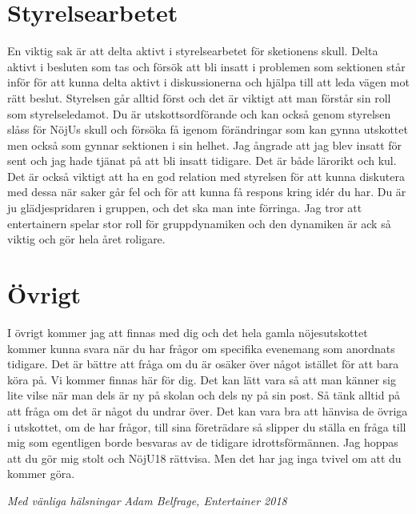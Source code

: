 \documentclass[10pt]{article}
\begin{document}
    \section{Styrelsearbetet}
    En viktig sak är att delta aktivt i styrelsearbetet för sketionens skull. Delta aktivt i besluten som tas och försök att bli insatt i problemen som sektionen står inför för att kunna delta aktivt i diskussionerna och hjälpa till att leda vägen mot rätt beslut. Styrelsen går alltid först och det är viktigt att man förstår sin roll som styrelseledamot. Du är utskottsordförande och kan också genom styrelsen slåss för NöjUs skull och försöka få igenom förändringar som kan gynna utskottet men också som gynnar sektionen i sin helhet. Jag ångrade att jag blev insatt för sent och jag hade tjänat på att bli insatt tidigare. Det är både lärorikt och kul. Det är också viktigt att ha en god relation med styrelsen för att kunna diskutera med dessa när saker går fel och för att kunna få respons kring idér du har. Du är ju glädjespridaren i gruppen, och det ska man inte förringa. Jag tror att entertainern spelar stor roll för gruppdynamiken och den dynamiken är ack så viktig och gör hela året roligare.

    \section{Övrigt}
    I övrigt kommer jag att finnas med dig och det hela gamla nöjesutskottet kommer kunna svara när du har frågor om specifika evenemang som anordnats tidigare. Det är bättre att fråga om du är osäker över något istället för att bara köra på. Vi kommer finnas här för dig. Det kan lätt vara så att man känner sig lite vilse när man dels är ny på skolan och dels ny på sin post. Så tänk alltid på att fråga om det är något du undrar över. Det kan vara bra att hänvisa de övriga i utskottet, om de har frågor, till sina företrädare så slipper du ställa en fråga till mig som egentligen borde besvaras av de tidigare idrottsförmännen. \newline
    Jag hoppas att du gör mig stolt och NöjU18 rättvisa. Men det har jag inga tvivel om att du kommer göra.

    \textit{Med vänliga hälsningar}\newline
    \textit{Adam Belfrage, Entertainer 2018}


    
\end{document}
